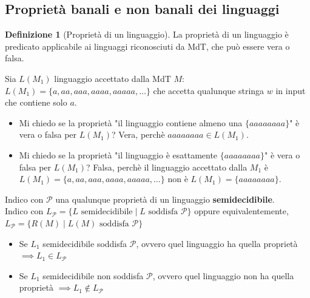 \documentclass{article}  %
\theoremstyle{definition}
\newtheorem{definition}{Definizione}[section]
\begin{document}
\subsection{Proprietà banali e non banali dei linguaggi}
\begin{definition}[Proprietà di un linguaggio]
	La proprietà di un linguaggio è predicato applicabile ai linguaggi riconosciuti da MdT, che può essere vera o falsa.
	\begin{esempio}[Esempio]
		\footnotesize %
		Sia $L(M_1)$ linguaggio accettato dalla MdT $M$: \\
		$L(M_1) = \{a, aa, aaa, aaaa, aaaaa, \dots\}$ che accetta qualunque stringa $w$ in input che contiene solo $a$.
		\begin{itemize}
			\item Mi chiedo se la proprietà "il linguaggio contiene almeno una $\{aaaaaaaa\}$" è vera o falsa per $L(M_1)$? Vera, perchè $aaaaaaaa \in L(M_1)$.
			\item Mi chiedo se la proprietà "il linguaggio è esattamente $\{aaaaaaaa\}$" è vera o falsa per $L(M_1)$? Falsa, perchè il linguaggio accettato
			      dalla $M_1$ è $L(M_1) = \{a, aa, aaa, aaaa, aaaaa, \dots\}$ non è $L(M_1) = \{aaaaaaaa\}$.
		\end{itemize}
	\end{esempio}
\end{definition}
Indico con $\mathscr{P}$ una qualunque proprietà di un linguaggio \textbf{semidecidibile}. \\
Indico con $L_{\mathscr{P}} = \{L \text{ semidecidibile} \mid L \text{ soddisfa }\mathscr{P}\}$ oppure equivalentemente,
$L_{\mathscr{P}} = \{R(M) \mid L(M) \text{ soddisfa }\mathscr{P}\}$
\begin{itemize}
	\item Se $L_1$ semidecidibile soddisfa $\mathscr{P}$, ovvero quel linguaggio ha quella proprietà $\implies L_1 \in L_{\mathscr{P}}$
	\item Se $L_1$ semidecidibile non soddisfa $\mathscr{P}$, ovvero quel linguaggio non ha quella proprietà $\implies L_1 \notin L_{\mathscr{P}}$
\end{itemize}
\end{document}
